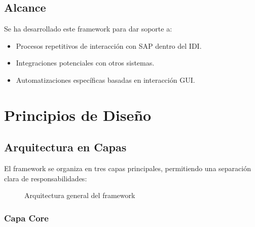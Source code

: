 \documentclass[11pt,a4paper]{article}
\begin{document}
\subsection{Alcance}

Se ha desarrollado este framework para dar soporte a:

\begin{itemize}
    \item Procesos repetitivos de interacción con SAP dentro del IDI.
    \item Integraciones potenciales con otros sistemas.
    \item Automatizaciones específicas basadas en interacción GUI.
\end{itemize}


\section{Principios de Diseño}

\subsection{Arquitectura en Capas}

El framework se organiza en tres capas principales, permitiendo una separación clara de responsabilidades:

\begin{figure}[H]
\centering
{}
\caption{Arquitectura general del framework}
\end{figure}

\subsubsection{Capa Core}
\end{document}
